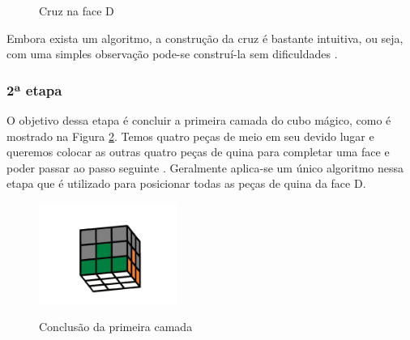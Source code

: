     
    
\begin{figure}[!htb]
    \centering
    \quad %
\caption{Cruz na face D}
\label{fig:figcc}
\end{figure}
    
    
Embora exista um algoritmo, a construção da cruz é bastante intuitiva, ou seja, com uma simples observação pode-se construí-la sem dificuldades \cite{jose}.  


\subsubsection{2ª etapa}


O objetivo dessa etapa é concluir a primeira camada do cubo mágico, como é mostrado na Figura \ref{fig:fig2222}. Temos quatro peças de meio em seu devido lugar e queremos colocar as outras quatro peças de quina para completar uma face e poder passar ao passo seguinte \cite{jose}. Geralmente aplica-se um único algoritmo nessa etapa que é utilizado para posicionar todas as peças de quina da face D.
\begin{figure}[!htb]
    \centering
    {
        \includegraphics[height=3.3cm]{imagens/passo2.jpg}
        \label{figFront}
    }
    
\caption{Conclusão da primeira camada}
\label{fig:fig2222}
\end{figure}

